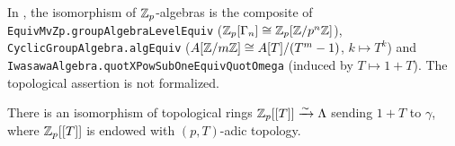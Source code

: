 \begin{remark}
In {\Lean}, the isomorphism of ${\mathbb {Z}}_p$-algebras is the composite of
\texttt{EquivMvZp.groupAlgebraLevelEquiv}
(${\mathbb {Z}}_p[\Gamma_n]\cong{\mathbb {Z}}_p[{\mathbb {Z}}/p^n{\mathbb {Z}}]$), \texttt{CyclicGroupAlgebra.algEquiv}
($A[{\mathbb {Z}}/m{\mathbb {Z}}]\cong A[T]/(T^m-1)$, $k\mapsto T^k$) and
\texttt{IwasawaAlgebra.quotXPowSubOneEquivQuotOmega} (induced by $T\mapsto
1+T$). The topological assertion is not formalized.
\end{remark}

\begin{prop}
\label{Iwasawa-alg-isom}
There is an isomorphism of topological rings
${\mathbb {Z}}_p[[T]]\xrightarrow\sim\Lambda$
sending $1+T$ to $\gamma$,
where ${\mathbb {Z}}_p[[T]]$ is endowed with $(p,T)$-adic topology.
\end{prop}

